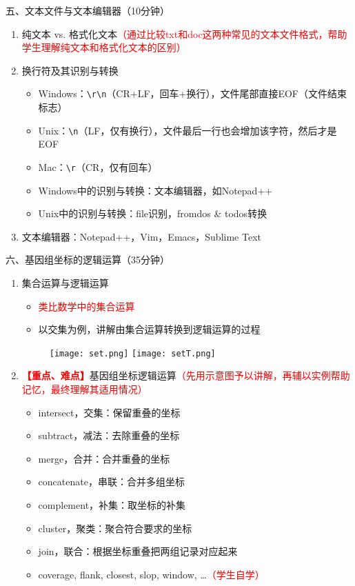 \documentclass{TIJMUjiaoanLL}
\begin{document}
\vspace*{0.2cm}
\noindent
五、文本文件与文本编辑器（10分钟）
\begin{enumerate}
  \item 纯文本 vs. 格式化文本\textcolor{red}{（通过比较txt和doc这两种常见的文本文件格式，帮助学生理解纯文本和格式化文本的区别）}
  \item 换行符及其识别与转换
    \begin{itemize}
      \item Windows：\verb|\r\n|（CR+LF，回车+换行），文件尾部直接EOF（文件结束标志）
      \item Unix：\verb|\n|（LF，仅有换行），文件最后一行也会增加该字符，然后才是EOF
      \item Mac：\verb|\r|（CR，仅有回车）
      \item Windows中的识别与转换：文本编辑器，如Notepad++
      \item Unix中的识别与转换：file识别，fromdos \& todos转换
    \end{itemize}
  \item 文本编辑器：Notepad++，Vim，Emacs，Sublime Text
\end{enumerate}


\otherTail
\newpage
\otherHeader


\noindent
六、基因组坐标的逻辑运算（35分钟）
\begin{enumerate}
  \item 集合运算与逻辑运算
    \begin{itemize}
      \item \textcolor{red}{类比数学中的集合运算}
      \item 以交集为例，讲解由集合运算转换到逻辑运算的过程
    \end{itemize}
    \begin{figure}[h]
      \centering
      \texttt{[image: set.png]}
      \hspace*{1cm}
      \texttt{[image: setT.png]}
    \end{figure}
  \item \textcolor{red}{\textbf{【重点、难点】}}基因组坐标逻辑运算\textcolor{red}{（先用示意图予以讲解，再辅以实例帮助记忆，最终理解其适用情况）}
    \begin{itemize}
      \item intersect，交集：保留重叠的坐标
      \item subtract，减法：去除重叠的坐标
      \item merge，合并：合并重叠的坐标
      \item concatenate，串联：合并多组坐标
      \item complement，补集：取坐标的补集
      \item cluster，聚类：聚合符合要求的坐标
      \item join，联合：根据坐标重叠把两组记录对应起来
      \item coverage, flank, closest, slop, window, \ldots \textcolor{red}{（学生自学）}
    \end{itemize}
\end{enumerate}
\end{document}
